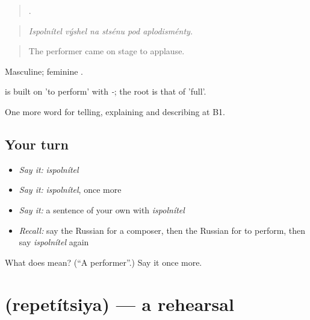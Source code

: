\begin{quote}
     .
\end{quote}

\begin{quote}
\emph{Ispolnítel výshel na stsénu pod aplodisménty.}
\end{quote}

\begin{quote}
The performer came on stage to applause.
\end{quote}

Masculine; feminine .

\begin{cousinweb}
\emph{} is built on \emph{} 'to perform' with \emph{-}; the root is that of \emph{} 'full'.
\end{cousinweb}

\begin{grammarlens}[title={What you've built}]
One more word for telling, explaining and describing at B1.
\end{grammarlens}

\subsection*{Your turn}
\begin{itemize}
\raggedright
  \item \emph{Say it:} \emph{ispolnítel}
  \item \emph{Say it:} \emph{ispolnítel}, once more
  \item \emph{Say it:} a sentence of your own with \emph{ispolnítel}
  \item \emph{Recall:} say the Russian for a composer, then the Russian for to perform, then say \emph{ispolnítel} again
\end{itemize}

\begin{tcolorbox}[breakable,colback=teal!4,colframe=teal!35!black,title={Before you move on}]
What does  mean? (\textquotedblleft{}A performer\textquotedblright{}.) Say it once more.
\end{tcolorbox}
\section[\texorpdfstring{\ru{репетиция} (repetítsiya)}{репетиция (repetítsiya)}]{ (repetítsiya) — a rehearsal}

